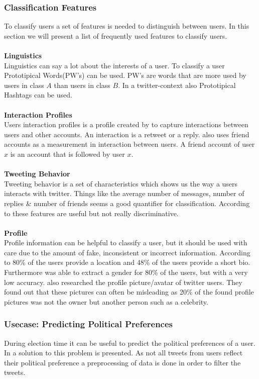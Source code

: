 \documentclass{article}
\begin{document}
\subsubsection{Classification Features}
To classify users a set of features is needed to distinguish between users. In this section we will present a list of frequently used features to classify users.  
\\\\
\textbf{Linguistics}\\
Linguistics can say a lot about the interests of a user. To classify a user Prototipical Words(PW's) can be used.  \cite{userclasst} PW's are words that are more used by users in class $A$ than users in class $B$. In a twitter-context also Prototipical Hashtags can be used.
\\\\
\textbf{Interaction Profiles}\\
Users interaction profiles is a profile created by \cite{pol} to capture interactions between users and other accounts. An interaction is a retweet or a reply. \cite{usermachine} also uses friend accounts as a measurement in interaction between users. A friend account of user $x$ is an account that is followed by user $x$. 
\\\\
\textbf{Tweeting Behavior}\\
Tweeting behavior is a set of characteristics which shows us the way a users interacts with twitter. Things like the average number of messages, number of replies \& number of friends seems a good quantifier for classification. According to \cite{usermachine} these features are useful but not really discriminative. 
\\\\
\textbf{Profile}\\
Profile information can be helpful to classify a user, but it should be used with care due to the amount of fake, inconsistent or incorrect information. According to \cite{usermachine} 80\% of the users provide a location and 48\% of the users provide a short bio. Furthermore \cite{usermachine} was able to extract a gender for 80\% of the users, but with a very low accuracy. \cite{usermachine} also researched the profile picture/avatar of twitter users. They found out that these pictures can often be misleading as 20\% of the found profile pictures was not the owner but another person such as a celebrity. 

\subsubsection{Usecase: Predicting Political Preferences}
During election time it can be useful to predict the political preferences of a user. In \cite{pol} a solution to this problem is presented. As not all tweets from users reflect their political preference a preprocessing of data is done in order to filter the tweets. 
\end{document}

